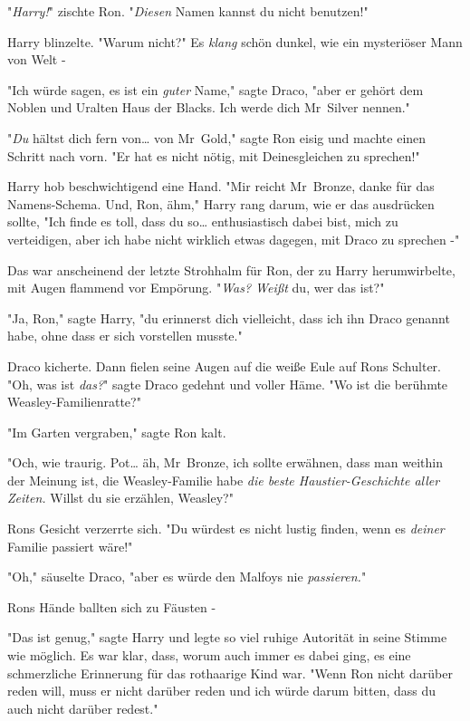 {"\emph{Harry!}" zischte Ron. "\emph{Diesen} Namen kannst du nicht benutzen!"

Harry blinzelte. "Warum nicht?" Es \emph{klang} schön dunkel, wie ein mysteriöser Mann von Welt -

"Ich würde sagen, es ist ein \emph{guter} Name," sagte Draco, "aber er gehört dem Noblen und Uralten Haus der Blacks. Ich werde dich Mr~Silver nennen."

"\emph{Du} hältst dich fern von… von Mr~Gold," sagte Ron eisig und machte einen Schritt nach vorn. "Er hat es nicht nötig, mit Deinesgleichen zu sprechen!"

Harry hob beschwichtigend eine Hand. "Mir reicht Mr~Bronze, danke für das Namens-Schema. Und, Ron, ähm," Harry rang darum, wie er das ausdrücken sollte, "Ich finde es toll, dass du so… enthusiastisch dabei bist, mich zu verteidigen, aber ich habe nicht wirklich etwas dagegen, mit Draco zu sprechen -"

Das war anscheinend der letzte Strohhalm für Ron, der zu Harry herumwirbelte, mit Augen flammend vor Empörung. "\emph{Was? Weißt} du, wer das ist?"

"Ja, Ron," sagte Harry, "du erinnerst dich vielleicht, dass ich ihn Draco genannt habe, ohne dass er sich vorstellen musste."

Draco kicherte. Dann fielen seine Augen auf die weiße Eule auf Rons Schulter. "Oh, was ist \emph{das?}" sagte Draco gedehnt und voller Häme. "Wo ist die berühmte Weasley-Familienratte?"

"Im Garten vergraben," sagte Ron kalt.

"Och, wie traurig. Pot… äh, Mr~Bronze, ich sollte erwähnen, dass man weithin der Meinung ist, die Weasley-Familie habe \emph{die beste Haustier-Geschichte aller Zeiten.} Willst du sie erzählen, Weasley?"

Rons Gesicht verzerrte sich. "Du würdest es nicht lustig finden, wenn es \emph{deiner} Familie passiert wäre!"

"Oh," säuselte Draco, "aber es würde den Malfoys nie \emph{passieren.}"

Rons Hände ballten sich zu Fäusten -

"Das ist genug," sagte Harry und legte so viel ruhige Autorität in seine Stimme wie möglich. Es war klar, dass, worum auch immer es dabei ging, es eine schmerzliche Erinnerung für das rothaarige Kind war. "Wenn Ron nicht darüber reden will, muss er nicht darüber reden und ich würde darum bitten, dass du auch nicht darüber redest."

}
